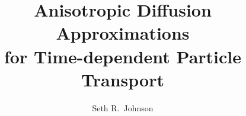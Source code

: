\documentclass[letterpaper]{umthesis}
\author{Seth R.~Johnson}
\title{Anisotropic Diffusion Approximations \\ for Time-dependent Particle
Transport}
\begin{document}
\begin{finalabstract}

\end{finalabstract}

\end{document}

